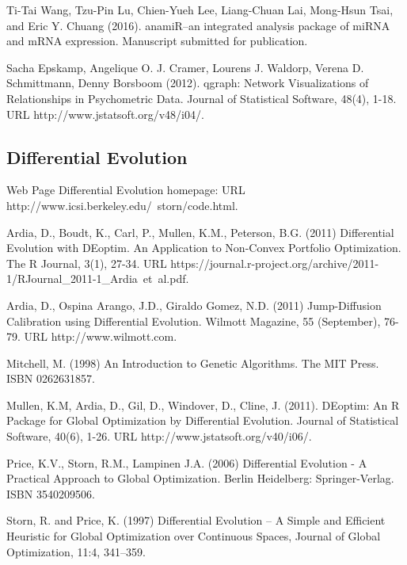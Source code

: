 Ti-Tai Wang, Tzu-Pin Lu, Chien-Yueh Lee, Liang-Chuan Lai, Mong-Hsun Tsai, and Eric Y. Chuang (2016). 
\newblock anamiR--an integrated analysis package of miRNA and mRNA expression.
\newblock Manuscript submitted for publication.

Sacha Epskamp, Angelique O. J. Cramer, Lourens J. Waldorp, Verena D. Schmittmann, Denny Borsboom (2012). 
\newblock qgraph: Network Visualizations of Relationships in Psychometric Data. 
\newblock Journal of Statistical Software, 48(4), 1-18. URL http://www.jstatsoft.org/v48/i04/.

\subsection{Differential Evolution}

 Web Page
\newblock Differential Evolution homepage: 
\newblock URL http://www.icsi.berkeley.edu/~storn/code.html.

Ardia, D., Boudt, K., Carl, P., Mullen, K.M., Peterson, B.G. (2011) 
\newblock Differential Evolution with DEoptim. An Application to Non-Convex Portfolio Optimization. 
\newblock The R Journal, 3(1), 27-34. URL https://journal.r-project.org/archive/2011-1/RJournal_2011-1_Ardia~et~al.pdf.

Ardia, D., Ospina Arango, J.D., Giraldo Gomez, N.D. (2011) 
\newblock Jump-Diffusion Calibration using Differential Evolution. 
\newblock Wilmott Magazine, 55 (September), 76-79. URL http://www.wilmott.com.

Mitchell, M. (1998) An Introduction to Genetic Algorithms.
\newblock The MIT Press. 
\newblock ISBN 0262631857.

Mullen, K.M, Ardia, D., Gil, D., Windover, D., Cline, J. (2011). 
\newblock DEoptim: An R Package for Global Optimization by Differential Evolution. 
\newblock Journal of Statistical Software, 40(6), 1-26. URL http://www.jstatsoft.org/v40/i06/.

Price, K.V., Storn, R.M., Lampinen J.A. (2006) 
\newblock Differential Evolution - A Practical Approach to Global Optimization. 
\newblock Berlin Heidelberg: Springer-Verlag. ISBN 3540209506.

Storn, R. and Price, K. (1997) 
\newblock Differential Evolution – A Simple and Efficient Heuristic for Global Optimization over Continuous Spaces, 
\newblock Journal of Global Optimization, 11:4, 341–359.

